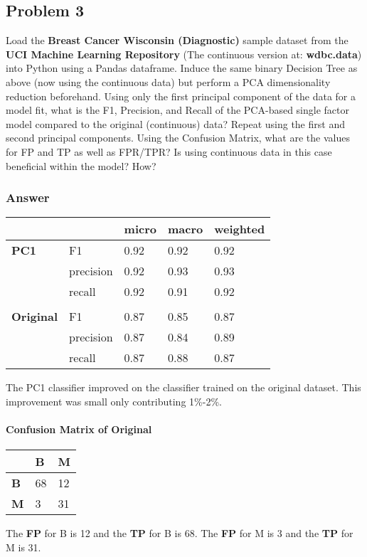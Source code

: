\documentclass[11pt]{article}
\begin{document}
    \subsection{Problem 3}\label{problem-3}

Load the \textbf{Breast Cancer Wisconsin (Diagnostic)} sample dataset
from the \textbf{UCI Machine Learning Repository} (The continuous
version at: \textbf{wdbc.data}) into Python using a Pandas dataframe.
Induce the same binary Decision Tree as above (now using the continuous
data) but perform a PCA dimensionality reduction beforehand. Using only
the first principal component of the data for a model fit, what is the
F1, Precision, and Recall of the PCA-based single factor model compared
to the original (continuous) data? Repeat using the first and second
principal components. Using the Confusion Matrix, what are the values
for FP and TP as well as FPR/TPR? Is using continuous data in this case
beneficial within the model? How?

    \subsubsection{Answer}\label{answer}

\begin{longtable}[]{@{}lllll@{}}
\toprule
& & micro & macro & weighted\tabularnewline
\midrule
\endhead
\textbf{PC1} & F1 & 0.92 & 0.92 & 0.92\tabularnewline
& precision & 0.92 & 0.93 & 0.93\tabularnewline
& recall & 0.92 & 0.91 & 0.92\tabularnewline
& & & &\tabularnewline
\textbf{Original} & F1 & 0.87 & 0.85 & 0.87\tabularnewline
& precision & 0.87 & 0.84 & 0.89\tabularnewline
& recall & 0.87 & 0.88 & 0.87\tabularnewline
\bottomrule
\end{longtable}

The PC1 classifier improved on the classifier trained on the original
dataset. This improvement was small only contributing 1\%-2\%.

\paragraph{Confusion Matrix of
Original}\label{confusion-matrix-of-original}

\begin{longtable}[]{@{}lll@{}}
\toprule
& B & M\tabularnewline
\midrule
\endhead
\textbf{B} & 68 & 12\tabularnewline
\textbf{M} & 3 & 31\tabularnewline
\bottomrule
\end{longtable}

The \textbf{FP} for B is 12 and the \textbf{TP} for B is 68. The
\textbf{FP} for M is 3 and the \textbf{TP} for M is 31.
\end{document}

